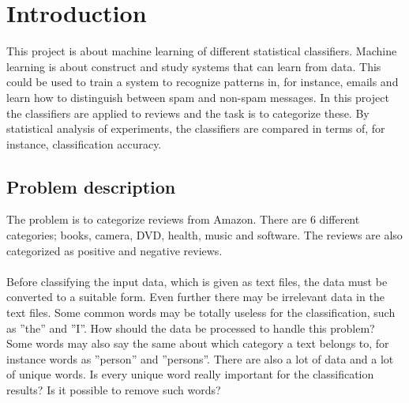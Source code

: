 \chapter{Introduction}
This project is about machine learning of different statistical classifiers.
Machine learning is about construct and study systems that can learn from data.
This could be used to train a system to recognize patterns in, for instance, emails and learn how to distinguish between spam and non-spam messages. In this project the classifiers are applied to reviews and the task is to categorize these.
By statistical analysis of experiments, the classifiers are compared in terms of, for instance, classification accuracy.
\section{Problem description}
The problem is to categorize reviews from Amazon. There are 6 different categories;
books, camera, DVD, health, music and software. The reviews are also
categorized as positive and negative reviews.
\\\\
Before classifying the input data, which is given as text files, the data must be
converted to a suitable form. Even further there may be irrelevant data
in the text files. Some common words may be totally useless for the classification,
such as ''the'' and ''I''. How should the data be processed to handle this
problem? Some words may also say the same about which category a text belongs to, for instance
words as ''person'' and ''persons''. There are also a lot of data and  a lot of
unique words. Is every unique word really important for the classification
results? Is it possible to remove such words?


